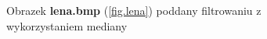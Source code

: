\documentclass{classrep}
\begin{document}
\begin{figure}
{{  \label{fig.lena_median_5x5}
 }
}
\caption{Obrazek \textbf{lena.bmp} (\ref{fig.lena}) poddany filtrowaniu z wykorzystaniem mediany}
\label{fig.lena_median}
\end{figure}

\end{document}
